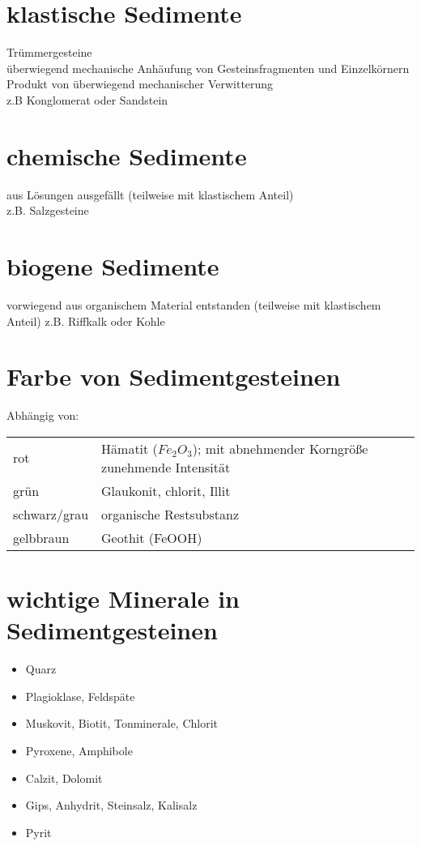 \documentclass[a4, 12pt]{scrreprt}
\begin{document}
\section{klastische Sedimente}

Trümmergesteine\\
überwiegend mechanische Anhäufung von Gesteinsfragmenten und Einzelkörnern\\
Produkt von überwiegend mechanischer Verwitterung\\
z.B Konglomerat oder Sandstein

\section{chemische Sedimente}

aus Lösungen ausgefällt (teilweise mit klastischem Anteil)\\
z.B. Salzgesteine

\section{biogene Sedimente}

vorwiegend aus organischem Material entstanden (teilweise mit klastischem Anteil)
z.B. Riffkalk oder Kohle

\section{Farbe von Sedimentgesteinen}

Abhängig von:\\
\begin{tabular}{ll}
rot & Hämatit ($Fe_2O_3$); mit abnehmender Korngröße zunehmende Intensität\\
grün & Glaukonit, chlorit, Illit\\
schwarz/grau & organische Restsubstanz\\
gelbbraun & Geothit (FeOOH)
\end{tabular}

\section{wichtige Minerale in Sedimentgesteinen}
\begin{itemize}
\item Quarz
\item Plagioklase, Feldspäte
\item Muskovit, Biotit, Tonminerale, Chlorit
\item Pyroxene, Amphibole
\item Calzit, Dolomit
\item Gips, Anhydrit, Steinsalz, Kalisalz
\item Pyrit
\end{itemize}
\end{document}
